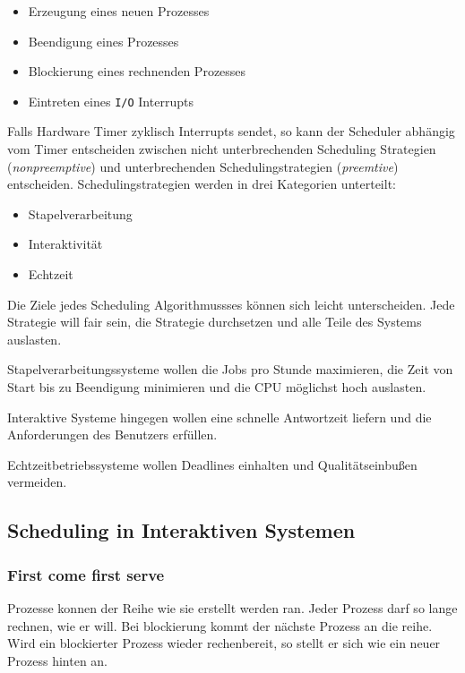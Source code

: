 \begin{itemize}
    \item Erzeugung eines neuen Prozesses
    \item Beendigung eines Prozesses
    \item Blockierung eines rechnenden Prozesses
    \item Eintreten eines \texttt{I/O} Interrupts
\end{itemize}

Falls Hardware Timer zyklisch Interrupts sendet, so kann der Scheduler abhängig vom Timer entscheiden zwischen nicht unterbrechenden Scheduling Strategien (\textit{nonpreemptive}) und unterbrechenden Schedulingstrategien (\textit{preemtive}) entscheiden. Schedulingstrategien werden in drei Kategorien unterteilt:

\begin{itemize}
    \item Stapelverarbeitung
    \item Interaktivität
    \item Echtzeit
\end{itemize}

Die Ziele jedes Scheduling Algorithmussses können sich leicht unterscheiden. Jede Strategie will fair sein, die Strategie durchsetzen und alle Teile des Systems auslasten.

Stapelverarbeitungssysteme wollen die Jobs pro Stunde maximieren, die Zeit von Start bis zu Beendigung minimieren und die CPU möglichst hoch auslasten.

Interaktive Systeme hingegen wollen eine schnelle Antwortzeit liefern und die Anforderungen des Benutzers erfüllen.

Echtzeitbetriebssysteme wollen Deadlines einhalten und Qualitätseinbußen vermeiden.

\subsection{Scheduling in Interaktiven Systemen}
\subsubsection{First come first serve}

Prozesse konnen der Reihe wie sie erstellt werden ran. Jeder Prozess darf so lange rechnen, wie er will. Bei blockierung kommt der nächste Prozess an die reihe. Wird ein blockierter Prozess wieder rechenbereit, so stellt er sich wie ein neuer Prozess hinten an.

